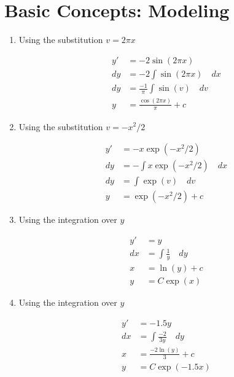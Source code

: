 \section{Basic Concepts: Modeling}

\begin{enumerate}
    \item Using the substitution $v = 2 \pi x$

          \begin{align}
              y' & = -2 \sin(2 \pi x)                     \\
              dy & = -2 \int \sin(2 \pi x) \quad dx       \\
              dy & = \frac{-1}{\pi} \int \sin(v) \quad dv \\
              y  & = \frac{\cos(2\pi x)}{\pi} + c
          \end{align}


    \item Using the substitution $v = -x^{2} / 2$

          \begin{align}
              y' & = -x \exp(-x^{2} / 2)                \\
              dy & = - \int x \exp(-x^{2} / 2) \quad dx \\
              dy & = \int \exp(v) \quad dv              \\
              y  & = \exp(-x^{2} / 2) + c
          \end{align}


    \item Using the integration over $y$

          \begin{align}
              y' & = y                         \\
              dx & = \int \frac{1}{y} \quad dy \\
              x  & = \ln(y) + c                \\
              y  & = C\exp(x)
          \end{align}


    \item Using the integration over $y$

          \begin{align}
              y' & = -1.5 y                      \\
              dx & = \int \frac{-2}{3y} \quad dy \\
              x  & = \frac{-2 \ln(y)}{3} + c     \\
              y  & = C\exp(-1.5x)
          \end{align}



\end{enumerate}
